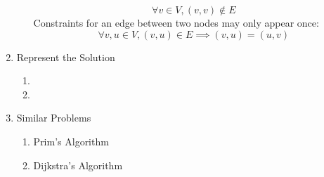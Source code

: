 \documentclass[12pt]{article}
\begin{document}
\begin{enumerate}
\begin{enumerate}[1.]
        \[\forall v \in V, (v,v) \notin E\]
        Constraints for an edge between two nodes may only appear once:
        \[\forall v, u \in V, (v,u) \in E \implies (v,u) = (u, v)\]    
    \end{enumerate}
\item Represent the Solution
    \begin{enumerate}[1.]
        \item 
        \item 
    \end{enumerate}
\item Similar Problems
    \begin{enumerate}[1.]
        \item Prim's Algorithm
        \item Dijkstra's Algorithm
    \end{enumerate}
\end{enumerate}
\end{document}
